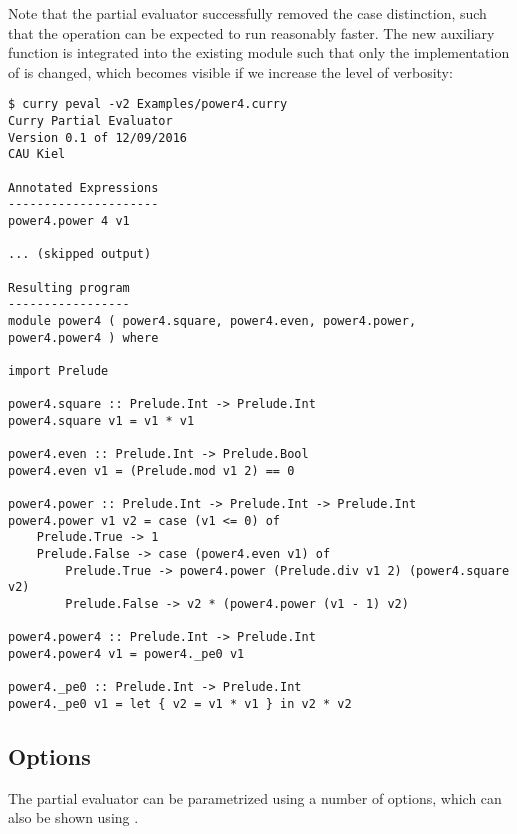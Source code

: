 Note that the partial evaluator successfully removed the case distinction,
such that the operation  can be expected to run reasonably faster.
The new auxiliary function  is integrated into the
existing module such that only the implementation of  is changed,
which becomes visible if we increase the level of verbosity:
\begin{lstlisting}[mathescape=false]
$ curry peval -v2 Examples/power4.curry
Curry Partial Evaluator
Version 0.1 of 12/09/2016
CAU Kiel

Annotated Expressions
---------------------
power4.power 4 v1

... (skipped output)

Resulting program
-----------------
module power4 ( power4.square, power4.even, power4.power, power4.power4 ) where

import Prelude

power4.square :: Prelude.Int -> Prelude.Int
power4.square v1 = v1 * v1

power4.even :: Prelude.Int -> Prelude.Bool
power4.even v1 = (Prelude.mod v1 2) == 0

power4.power :: Prelude.Int -> Prelude.Int -> Prelude.Int
power4.power v1 v2 = case (v1 <= 0) of
    Prelude.True -> 1
    Prelude.False -> case (power4.even v1) of
        Prelude.True -> power4.power (Prelude.div v1 2) (power4.square v2)
        Prelude.False -> v2 * (power4.power (v1 - 1) v2)

power4.power4 :: Prelude.Int -> Prelude.Int
power4.power4 v1 = power4._pe0 v1

power4._pe0 :: Prelude.Int -> Prelude.Int
power4._pe0 v1 = let { v2 = v1 * v1 } in v2 * v2
\end{lstlisting}

\subsection{Options}

The partial evaluator can be parametrized using a number of options,
which can also be shown using .

